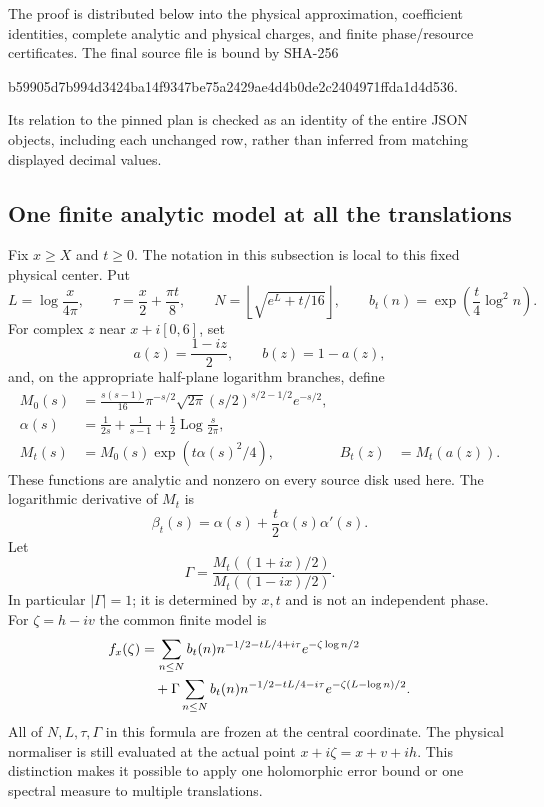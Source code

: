 \documentclass[11pt,a4paper]{article}
\theoremstyle{definition}
\theoremstyle{remark}
\DeclareMathOperator{\Log}{Log}
\begin{document}
The proof is distributed below into the physical approximation,
coefficient identities, complete analytic and physical charges, and
finite phase/resource certificates.  The final source file is bound by
SHA-256
\begin{center}\footnotesize\ttfamily
 b59905d7b994d3424ba14f9347be75a2429ae4d4b0de2c2404971ffda1d4d536.
\end{center}
Its relation to the pinned plan is checked as an identity of the entire
JSON objects, including each unchanged row, rather than inferred from
matching displayed decimal values.

\subsection{One finite analytic model at all the translations}
\label{src:common}

Fix $x\geq X$ and $t\geq0$.  The notation in this subsection is local to
this fixed physical center.  Put
\[
 L=\log\frac{x}{4\pi},\qquad
 \tau=\frac x2+\frac{\pi t}{8},\qquad
 N=\left\lfloor\sqrt{e^L+t/16}\right\rfloor,\qquad
 b_t(n)=\exp\left(\frac t4\log^2n\right).
\]
For complex $z$ near $x+i[0,6]$, set
\[
 a(z)=\frac{1-iz}{2},\qquad b(z)=1-a(z),
\]
and, on the appropriate half-plane logarithm branches, define
\begin{align*}
 M_0(s)&=\frac{s(s-1)}{16}\pi^{-s/2}\sqrt{2\pi}
       (s/2)^{s/2-1/2}e^{-s/2},\\
 \alpha(s)&=\frac1{2s}+\frac1{s-1}+\frac12\Log\frac{s}{2\pi},\\
 M_t(s)&=M_0(s)\exp(t\alpha(s)^2/4),
       &B_t(z)&=M_t(a(z)).
\end{align*}
These functions are analytic and nonzero on every source disk used here.
The logarithmic derivative of $M_t$ is
\[
 \beta_t(s)=\alpha(s)+\frac t2\alpha(s)\alpha'(s).
\]
Let
\[
 \Gamma=\frac{M_t((1+ix)/2)}{M_t((1-ix)/2)}.
\]
In particular $|\Gamma|=1$; it is determined by $x,t$ and is not an
independent phase.  For $\zeta=h-iv$ the common finite model is
\begin{align}
 f_x(\zeta)
 &=\sum_{n\leq N} b_t(n)n^{-1/2-tL/4+i\tau}
                   e^{-\zeta\log n/2}\notag\\
 &\quad+\Gamma\sum_{n\leq N} b_t(n)n^{-1/2-tL/4-i\tau}
                   e^{-\zeta(L-\log n)/2}.
 \label{src:common-model}
\end{align}
All of $N,L,\tau,\Gamma$ in this formula are frozen at the central
coordinate.  The physical normaliser is still evaluated at the actual
point $x+i\zeta=x+v+ih$.  This distinction makes it possible to apply one
holomorphic error bound or one spectral measure to multiple translations.
\end{document}
